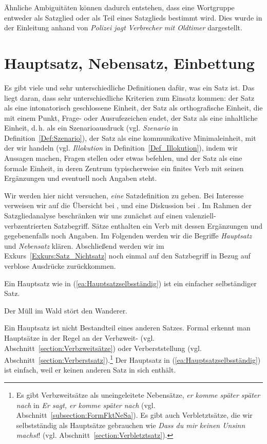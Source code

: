 Ähnliche Ambiguitäten können dadurch entstehen, dass eine Wortgruppe entweder als Satzglied oder als Teil eines Satzglieds bestimmt wird. Dies wurde in der Einleitung anhand von \textit{Polizei jagt Verbrecher mit Oldtimer} dargestellt. 


\section{Hauptsatz, Nebensatz, Einbettung}\label{section:Grundlagen}

Es gibt viele und sehr unterschiedliche Definitionen dafür, was ein Satz ist. Das liegt daran, dass sehr unterschiedliche Kriterien zum Einsatz kommen: der Satz als eine intonatorisch geschlossene Einheit, der Satz als orthografische Einheit, die mit einem Punkt, Frage- oder Ausrufezeichen endet, der Satz als eine inhaltliche Einheit, d.\,h. als ein Szenarioausdruck (vgl. \textit{Szenario} in Definition~\ref{Def:Szenario}), der Satz als eine kommunikative Minimaleinheit, mit der wir handeln (vgl. \textit{Illokution} in Definition~\ref{Def_Illokution}), indem wir Aussagen machen, Fragen stellen oder etwas befehlen, und der Satz als eine formale Einheit, in deren Zentrum typischerweise ein finites Verb mit seinen Ergänzungen und eventuell noch Angaben steht. 

Wir werden hier nicht versuchen, \textit{eine} Satzdefinition zu geben. Bei Interesse verweisen wir auf die Übersicht bei \citet[319--321]{Hentschel_Weydt2021}, \citet{Holler2022Satz} und eine Diskussion bei \citet[11--13]{Agel2017}. Im Rahmen der Satzgliedanalyse beschränken wir uns zunächst auf einen valenziell-verbzentrierten Satzbegriff. Sätze enthalten ein Verb mit dessen Ergänzungen und gegebenenfalls noch Angaben. Im Folgenden werden wir die Begriffe \textit{Hauptsatz} und \textit{Nebensatz} klären. Abschließend werden wir im Exkurs~\ref{Exkurs:Satz_Nichtsatz} noch einmal auf den Satzbegriff in Bezug auf verblose Ausdrücke zurückkommen.

Ein Hauptsatz wie in (\ref{ea:Hauptsatzselbsständig}) ist ein einfacher selbständiger Satz. 

\ea \label{ea:Hauptsatzselbsständig} Der Müll im Wald stört den Wanderer.
\z

Ein Hauptsatz ist nicht Bestandteil eines anderen Satzes. Formal erkennt man Hauptsätze in der Regel an der Verbzweit- (vgl. Abschnitt~\ref{section:Verbzweitsätze}) oder Verberststellung (vgl. Abschnitt~\ref{section:Verberstsatz}).\footnote{Es gibt Verbzweitsätze als uneingeleitete Nebensätze, \zB \textit{er komme später später nach} in \textit{Er sagt, er komme später nach} (vgl. Abschnitt~\ref{subsection:FormFktNeSa}). Es gibt auch Verbletztsätze, die wir selbstständig als Hauptsätze gebrauchen wie \textit{Dass du mir keinen Unsinn machst}! (vgl. Abschnitt~\ref{section:Verbletztsatz}).} Der Hauptsatz in (\ref{ea:Hauptsatzselbsständig}) ist einfach, weil er keinen anderen Satz in sich enthält. 


